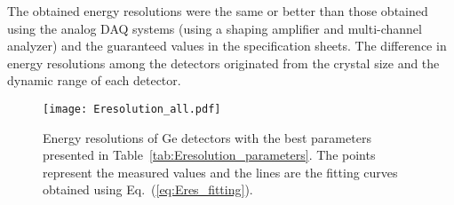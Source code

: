 The obtained energy resolutions were the same or better than those obtained using the analog DAQ systems (using a shaping amplifier and multi-channel analyzer) and the guaranteed values in the specification sheets.
The difference in energy resolutions among the detectors originated from the crystal size and the dynamic range of each detector.

\begin{figure}
  \centering
  \texttt{[image: Eresolution\_all.pdf]}
  \caption{Energy resolutions of Ge detectors with the best parameters presented in Table~\ref{tab:Eresolution_parameters}.
  The points represent the measured values and the lines are the fitting curves obtained using Eq.~(\ref{eq:Eres_fitting}).}
  \label{fig:Eresolution}
\end{figure}

